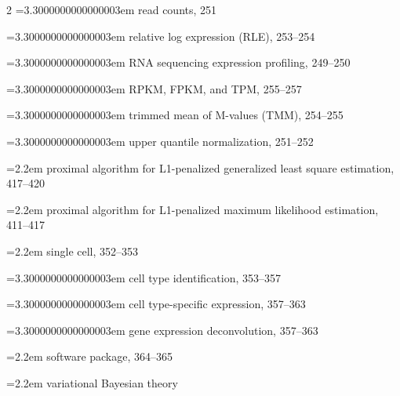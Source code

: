 \begin{multicols}{2}
\noindent\hangindent=3.3000000000000003em \hspace*{2.2em}read counts, 251\par
\noindent\hangindent=3.3000000000000003em \hspace*{2.2em}relative log expression (RLE), 253--254\par
\noindent\hangindent=3.3000000000000003em \hspace*{2.2em}RNA sequencing expression profiling, 249--250\par
\noindent\hangindent=3.3000000000000003em \hspace*{2.2em}RPKM, FPKM, and TPM, 255--257\par
\noindent\hangindent=3.3000000000000003em \hspace*{2.2em}trimmed mean of M-values (TMM), 254--255\par
\noindent\hangindent=3.3000000000000003em \hspace*{2.2em}upper quantile normalization, 251--252\par
\noindent\hangindent=2.2em \hspace*{1.1em}proximal algorithm for L1-penalized generalized least square estimation, 417--420\par
\noindent\hangindent=2.2em \hspace*{1.1em}proximal algorithm for L1-penalized maximum likelihood estimation, 411--417\par
\noindent\hangindent=2.2em \hspace*{1.1em}single cell, 352--353\par
\noindent\hangindent=3.3000000000000003em \hspace*{2.2em}cell type identification, 353--357\par
\noindent\hangindent=3.3000000000000003em \hspace*{2.2em}cell type-specific expression, 357--363\par
\noindent\hangindent=3.3000000000000003em \hspace*{2.2em}gene expression deconvolution, 357--363\par
\noindent\hangindent=2.2em \hspace*{1.1em}software package, 364--365\par
\noindent\hangindent=2.2em \hspace*{1.1em}variational Bayesian theory\par

\end{multicols}
